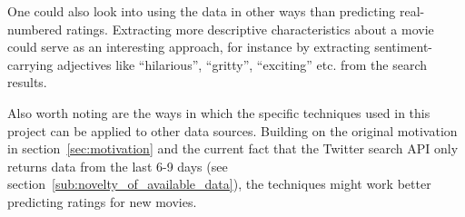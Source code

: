 One could also look into using the data in other ways than predicting real-numbered ratings. Extracting more descriptive characteristics about a movie could serve as an interesting approach, for instance by extracting sentiment-carrying adjectives like ``hilarious'', ``gritty'', ``exciting'' etc. from the search results.

Also worth noting are the ways in which the specific techniques used in this project can be applied to other data sources. Building on the original motivation in section~\ref{sec:motivation} and the current fact that the Twitter search API only returns data from the last 6-9 days (see section~\ref{sub:novelty_of_available_data}), the techniques might work better predicting ratings for new movies.

